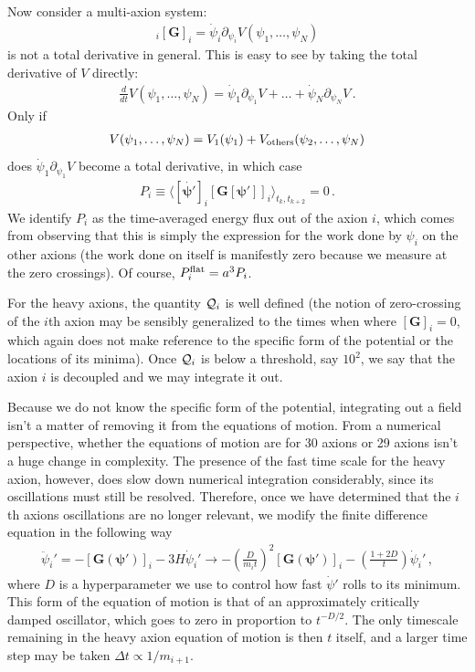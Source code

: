 \documentclass[11pt]{article}
\begin{document}
Now consider a multi-axion system:
\begin{align}
    [\dot{\bm\psi}]_i[\bm G]_i = \dot \psi_i\partial_{\psi_i}V(\psi_1,\dots,\psi_N)
\end{align}
is not a total derivative in general. This is easy to see by taking the total derivative of $V$ directly:
\begin{align}
    \frac{d}{dt}V(\psi_1,\dots,\psi_N) = \dot\psi_1\partial_{\psi_1}V + \dots+\dot\psi_N\partial_{\psi_N}V\,.
\end{align}
Only if
\begin{align}
    V(\psi_1,\dots,\psi_N) = V_1(\psi_1) + V_{\rm others}(\psi_2,\dots,\psi_N)
\end{align}
does $\dot\psi_1\partial_{\psi_1}V$ become a total derivative, in which case
\begin{align}
    P_i\equiv \langle[\dot{\bm \psi'}]_i [\bm G[\bm\psi']]_i\rangle_{t_k,t_{k + 2}} = 0\,.
\end{align}
We identify $P_i$ as the time-averaged energy flux out of the axion $i$, which comes from observing that this is simply the expression for the work done by $\psi_i$ on the other axions (the work done on itself is manifestly zero because we measure at the zero crossings). Of course, $P_i^{\rm flat} = a^3 P_i$.

For the heavy axions, the quantity ${\cal Q}_i$ is well defined (the notion of zero-crossing of the $i$th axion may be sensibly generalized to the times when where $[\bm G]_i = 0$, which again does not make reference to the specific form of the potential or the locations of its minima). Once ${\cal Q}_i$ is below a threshold, say $10^{2}$, we say that the axion $i$ is decoupled and we may integrate it out.

Because we do not know the specific form of the potential, integrating out a field isn't a matter of removing it from the equations of motion. From a numerical perspective, whether the equations of motion are for 30 axions or 29 axions isn't a huge change in complexity. The presence of the fast time scale for the heavy axion, however, does slow down numerical integration considerably, since its oscillations must still be resolved. Therefore, once we have determined that the $i$th axions oscillations are no longer relevant, we modify the finite difference equation in the following way
\begin{align}\label{eqn:critical_damping_modification}
    \ddot\psi_i' = -[\bm G(\bm\psi')]_i - 3 H\dot\psi_i'\to -\left(\frac{D}{m_it}\right)^2[\bm G(\bm\psi')]_i - \left(\frac{1 + 2 D}{t}\right)\dot\psi_i'\,,
\end{align}
where $D$ is a hyperparameter we use to control how fast $\dot\psi'$ rolls to its minimum. This form of the equation of motion is that of an approximately critically damped oscillator, which goes to zero in proportion to $t^{-D/2}$. The only timescale remaining in the heavy axion equation of motion is then $t$ itself, and a larger time step may be taken $\Delta t\propto 1/m_{i + 1}$.
\end{document}
